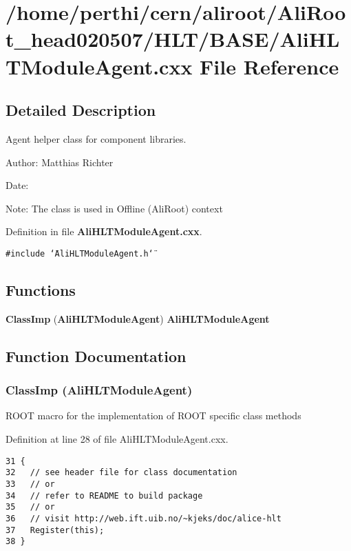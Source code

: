 \section{/home/perthi/cern/aliroot/Ali\-Root\_\-head020507/HLT/BASE/Ali\-HLTModule\-Agent.cxx File Reference}
\label{AliHLTModuleAgent_8cxx}


\subsection{Detailed Description}
Agent helper class for component libraries. 

\begin{Desc}
\item[Author:]Matthias Richter \end{Desc}
\begin{Desc}
\item[Date:]\end{Desc}
\begin{Desc}
\item[Note:]The class is used in Offline (Ali\-Root) context\end{Desc}


Definition in file {\bf Ali\-HLTModule\-Agent.cxx}.

{\tt \#include \char`\"{}Ali\-HLTModule\-Agent.h\char`\"{}}\par
\subsection*{Functions}
\begin{CompactItemize}
\item 
{\bf Class\-Imp} ({\bf Ali\-HLTModule\-Agent}) {\bf Ali\-HLTModule\-Agent}
\end{CompactItemize}


\subsection{Function Documentation}
\subsubsection{\setlength{\rightskip}{0pt plus 5cm}Class\-Imp ({\bf Ali\-HLTModule\-Agent})}\label{AliHLTModuleAgent_8cxx_a0}


ROOT macro for the implementation of ROOT specific class methods 

Definition at line 28 of file Ali\-HLTModule\-Agent.cxx.

\footnotesize\begin{verbatim}31 {
32   // see header file for class documentation
33   // or
34   // refer to README to build package
35   // or
36   // visit http://web.ift.uib.no/~kjeks/doc/alice-hlt
37   Register(this);
38 }
\end{verbatim}\normalsize 


